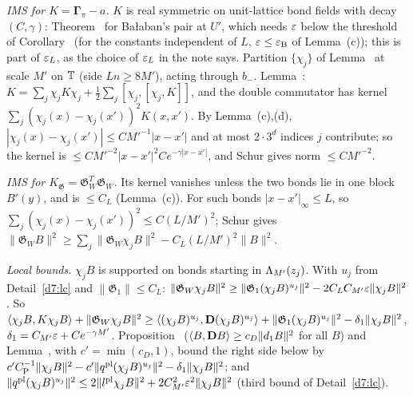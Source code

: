 \begin{detail}\label{d7:coercive}
\begin{step}
\emph{IMS for $K=\boldsymbol\Gamma_\pi-a$.} $K$ is real symmetric on unit-lattice bond fields with decay $(C,\gamma)$: Theorem~ for Ba\l aban's pair at $U'$, which needs $\varepsilon$ below the threshold of Corollary~ (for the constants independent of $L$, $\varepsilon\le\varepsilon_{\rm B}$ of Lemma~(c)); this is part of $\varepsilon_L$, as the choice of $\varepsilon_L$ in the note says. Partition $\{\chi_j\}$ of Lemma~ at scale $M'$ on $\mathbb T$ (side $Ln\ge8M'$), acting through $b_-$. Lemma~: $K=\sum_j\chi_jK\chi_j+\frac12\sum_j[\chi_j,[\chi_j,K]]$, and the double commutator has kernel $\sum_j(\chi_j(x)-\chi_j(x'))^2K(x,x')$. By Lemma~(c),(d), $|\chi_j(x)-\chi_j(x')|\le CM'^{-1}|x-x'|$ and at most $2\cdot3^d$ indices $j$ contribute; so the kernel is $\le CM'^{-2}|x-x'|^2Ce^{-\gamma|x-x'|}$, and Schur gives norm $\le CM'^{-2}$.
\end{step}
\begin{step}
\emph{IMS for $K_{\mathfrak G}=\mathfrak G_W^T\mathfrak G_W$.} Its kernel vanishes unless the two bonds lie in one block $B'(y)$, and is $\le C_L$ (Lemma~(c)). For such bonds $|x-x'|_\infty\le L$, so $\sum_j(\chi_j(x)-\chi_j(x'))^2\le C(L/M')^2$; Schur gives $\|\mathfrak G_WB\|^2\ge\sum_j\|\mathfrak G_W\chi_jB\|^2-C_L(L/M')^2\|B\|^2$.
\end{step}
\begin{step}
\emph{Local bounds.} $\chi_jB$ is supported on bonds starting in $\Lambda_{M'}(z_j)$. With $u_j$ from Detail~\ref{d7:lc} and $\|\mathfrak G_1\|\le C_L$: $\|\mathfrak G_W\chi_jB\|^2\ge\|\mathfrak G_1(\chi_jB)^{u_j}\|^2-2C_LC_{M'}\varepsilon\|\chi_jB\|^2$. So $\langle \chi_jB,K\chi_jB\rangle+\|\mathfrak G_W\chi_jB\|^2\ge\langle (\chi_jB)^{u_j},\mathbf D(\chi_jB)^{u_j}\rangle+\|\mathfrak G_1(\chi_jB)^{u_j}\|^2-\delta_1\|\chi_jB\|^2$, $\delta_1=C_{M'}\varepsilon+Ce^{-\gamma M'}$. Proposition~ ($\langle B,\mathbf D B\rangle\ge c_D\|d_1 B\|^2$ for all $B$) and Lemma~, with $c'=\min(c_D,1)$, bound the right side below by $c'C_{\rm P}^{-1}\|\chi_jB\|^2-c'\|q^{\rm pl}(\chi_jB)^{u_j}\|^2-\delta_1\|\chi_jB\|^2$; and $\|q^{\rm pl}(\chi_jB)^{u_j}\|^2\le2\|l^{\rm pl}\chi_jB\|^2+2C_{M'}^2\varepsilon^2\|\chi_jB\|^2$ (third bound of Detail~\ref{d7:lc}).
\end{step}
\begin{step}

\end{step}
\end{detail}
